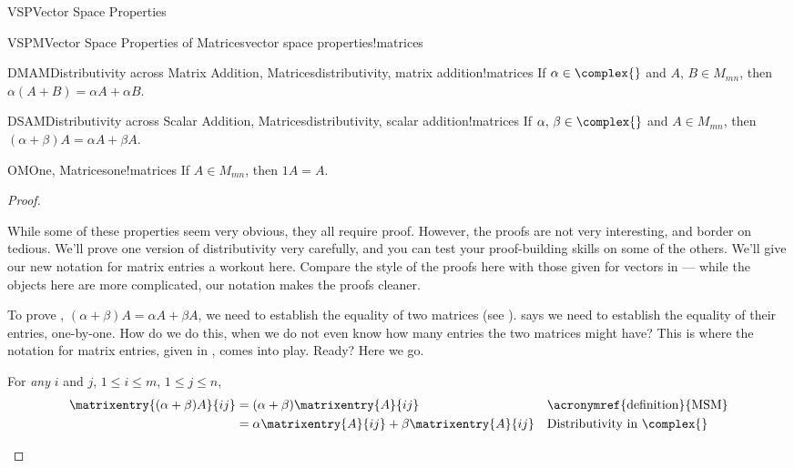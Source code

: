 \begin{subsect}{VSP}{Vector Space Properties}
\begin{theorem}{VSPM}{Vector Space Properties of Matrices}{vector space properties!matrices}
\begin{para}
\begin{propertylist}
%
\begin{property}{DMAM}{Distributivity across Matrix Addition, Matrices}{distributivity, matrix addition!matrices}
If $\alpha\in\complex{\null}$ and $A,\,B\in M_{mn}$, then $\alpha(A+B)=\alpha A+\alpha B$.\end{property}
%
\begin{property}{DSAM}{Distributivity across Scalar Addition, Matrices}{distributivity, scalar addition!matrices}
If $\alpha,\,\beta\in\complex{\null}$ and $A\in M_{mn}$, then
$(\alpha+\beta)A=\alpha A+\beta A$.\end{property}
%
\begin{property}{OM}{One, Matrices}{one!matrices}
If $A\in M_{mn}$, then $1A=A$.\end{property}
%
\end{propertylist}
\end{para}
\end{theorem}
%
\begin{proof}
\begin{para}While some of these properties seem very obvious, they all require proof.  However, the proofs are not very interesting, and border on tedious. We'll prove one version of distributivity very carefully, and you can test your proof-building skills on some of the others.  We'll give our new notation for matrix entries a workout here.  Compare the style of the proofs here with those given for vectors in  --- while the objects here are more complicated, our notation makes the proofs cleaner.\end{para}
%
\begin{para}To prove ,  $(\alpha+\beta)A=\alpha A+\beta A$, we need to establish the equality of two matrices (see ).   says we need to establish the equality of their entries, one-by-one.  How do we do this, when we do not even know how many entries the two matrices might have?  This is where the notation for matrix entries, given in , comes into play.  Ready?  Here we go.\end{para}
%
\begin{para}For {\em any} $i$ and $j$, $1\leq i\leq m$, $1\leq j\leq n$,
%
\begin{align*}
\matrixentry{(\alpha+\beta)A}{ij}&=
(\alpha+\beta)\matrixentry{A}{ij}&&\text{\acronymref{definition}{MSM}}\\
&=\alpha\matrixentry{A}{ij}+\beta\matrixentry{A}{ij}&&\text{Distributivity in $\complex{\null}$}\\

\end{align*}
\end{para}
\end{proof}
\end{subsect}
